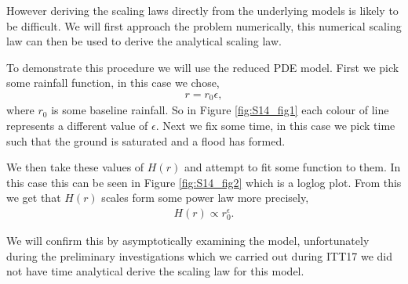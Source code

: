 \documentclass[11pt]{article}
\begin{document}
\noindent\begin{minipage}{0.53\textwidth}
    \qquad However deriving the scaling laws directly from the underlying models is likely to be difficult. We will first approach the problem numerically, this numerical scaling law can then be used to derive the analytical scaling law.
    
    \qquad To demonstrate this procedure we will use the reduced PDE model. First we pick some rainfall function, in this case we chose, \begin{align}
        r = r_0\epsilon,
    \end{align}
    where $r_0$ is some baseline rainfall. So in Figure \ref{fig:S14_fig1} each colour of line represents a different value of $\epsilon$. Next we fix some time, in this case we pick time such that the ground is saturated and a flood has formed. 
    
    \qquad We then take these values of $H(r)$ and attempt to fit some function to them. In this case this can be seen in Figure \ref{fig:S14_fig2} which is a loglog plot. From this we get that $H(r)$ scales form some power law more precisely, \begin{align}
    H(r)\propto r_0^{\epsilon}.
    \end{align}
    
    \qquad We will confirm this by asymptotically examining the model, unfortunately during the preliminary investigations which we carried out during ITT17 we did not have time analytical derive the scaling law for this model.
    \end{minipage}
\hspace{0.05\textwidth}
\end{document}
